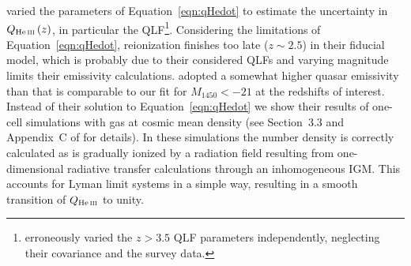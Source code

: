 \documentclass[fleqn,usenatbib]{mnras}
\begin{document}
\citet{2016ApJ...828...90L} varied the parameters of
Equation~\eqref{eqn:qHedot} to estimate the uncertainty in
$Q_\ion{He}{iii}\left(z\right)$, in particular the
QLF\footnote{\citet{2016ApJ...828...90L} erroneously varied the
  $z>3.5$ QLF parameters independently, neglecting their covariance
  and the survey data.}.
Considering the limitations of Equation~\eqref{eqn:qHedot},
 reionization finishes too late ($z\sim 2.5$) in their
fiducial model, which is probably due to their considered QLFs and
varying magnitude limits their emissivity calculations.
\citet{2018arXiv180104931P} adopted a somewhat higher quasar
emissivity than \citet{2012ApJ...746..125H} that is comparable to our
fit for $M_{1450}<-21$ at the redshifts of interest.  Instead of their
solution to Equation~\eqref{eqn:qHedot} we show their results of
one-cell simulations with gas at cosmic mean density (see Section~3.3
and Appendix~C of \citealt{2018arXiv180104931P} for details).  In
these simulations the  number density is correctly
calculated as  is gradually ionized by a radiation field
resulting from one-dimensional radiative transfer calculations through
an inhomogeneous IGM.  This accounts for  Lyman limit
systems in a simple way, resulting in a smooth transition of
$Q_\ion{He}{iii}$ to unity.
\end{document}
